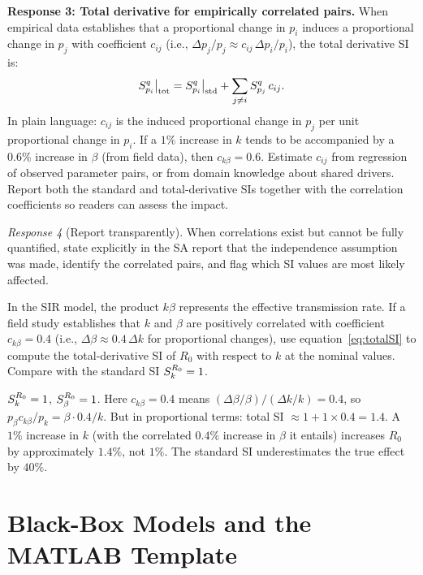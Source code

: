 \textbf{Response 3: Total derivative for empirically correlated pairs.}
When empirical data establishes that a proportional change in $p_i$
induces a proportional change in $p_j$ with coefficient $c_{ij}$
(i.e., $\Delta p_j/p_j \approx c_{ij}\,\Delta p_i/p_i$),
the total derivative SI is:
\begin{equation}
  S_{p_i}^{q}\big|_{\mathrm{tot}}
  = S_{p_i}^{q}\big|_{\mathrm{std}}
  + \sum_{j \neq i} S_{p_j}^{q}\,c_{ij}.
  \label{eq:totalSI}
\end{equation}
In plain language: $c_{ij}$ is the induced proportional change in $p_j$
per unit proportional change in $p_i$. If a $1\%$ increase in $k$
tends to be accompanied by a $0.6\%$ increase in $\beta$ (from field data),
then $c_{k\beta} = 0.6$. Estimate $c_{ij}$ from regression of observed
parameter pairs, or from domain knowledge about shared drivers.
Report both the standard and total-derivative SIs together with
the correlation coefficients so readers can assess the impact.

\textit{Response 4} (Report transparently).
When correlations exist but cannot be fully quantified,
state explicitly in the SA report that the independence
assumption was made, identify the correlated pairs,
and flag which SI values are most likely affected.

\begin{selfcheck}
In the SIR model, the product $k\beta$ represents the effective
transmission rate. If a field study establishes that $k$ and $\beta$
are positively correlated with coefficient $c_{k\beta} = 0.4$
(i.e., $\Delta\beta \approx 0.4\,\Delta k$ for proportional changes),
use equation~\eqref{eq:totalSI} to compute the total-derivative SI
of $R_0$ with respect to $k$ at the nominal values.
Compare with the standard SI $S_{k}^{R_0} = 1$.
\end{selfcheck}
\begin{scAnswer}
$S_{k}^{R_0} = 1$, $S_{\beta}^{R_0} = 1$.
Here $c_{k\beta} = 0.4$ means $(\Delta\beta/\beta)/(\Delta k/k) = 0.4$,
so $p_\beta c_{k\beta}/p_k = \beta\cdot 0.4/k$.
But in proportional terms: total SI $\approx 1 + 1 \times 0.4 = 1.4$.
A $1\%$ increase in $k$ (with the correlated $0.4\%$ increase in $\beta$
it entails) increases $R_0$ by approximately $1.4\%$, not $1\%$.
The standard SI underestimates the true effect by $40\%$.
\end{scAnswer}

\section{Black-Box Models and the MATLAB Template}
\label{sec:blackbox}

